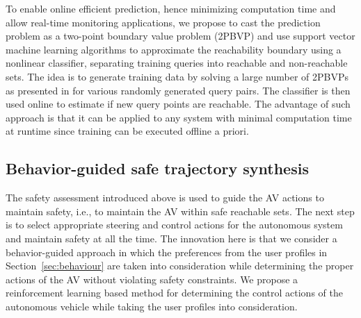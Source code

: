 To enable online efficient prediction, hence minimizing computation time and allow real-time monitoring applications, we propose to cast the prediction problem as a two-point boundary value problem (2PBVP) \cite{allen2014machine} and use support vector machine learning algorithms to approximate the reachability boundary using a nonlinear classifier, separating training queries into reachable and non-reachable sets. The idea is to generate training data by solving a large number of 2PBVPs as presented in \cite{allen2014machine} for various randomly generated query pairs. The classifier is then used online to estimate if new query points are reachable. The advantage of such approach is that it can be applied to any system with minimal computation time at runtime since training can be executed offline a priori. 

\subsection{Behavior-guided safe trajectory synthesis} 
The safety assessment introduced above is used to guide the AV actions to maintain safety, i.e., to maintain the AV within safe reachable sets. 
The next step is to select appropriate steering and control actions for the autonomous system and maintain safety at all the time. 
The innovation here is that we consider a behavior-guided approach in which the preferences from the user profiles in Section~\ref{sec:behaviour} are taken into consideration while determining the proper actions of the AV without violating safety constraints. 
We propose a reinforcement learning based method for determining the control actions of the autonomous vehicle while taking the user profiles into consideration. 

